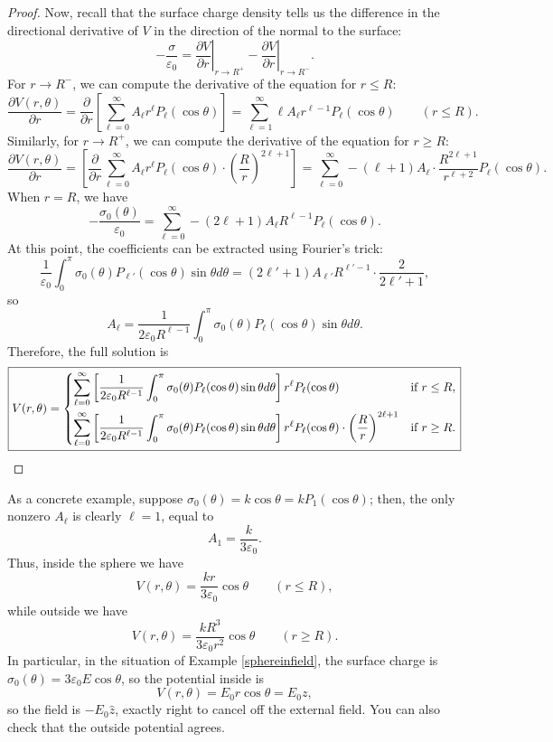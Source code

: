 \begin{proof}
Now, recall that the surface charge density tells us the difference in the directional derivative of $V$ in the direction of the normal to the surface:
\[-\frac{\sigma}{\varepsilon_0}=\left.\frac{\partial V}{\partial r}\right\rvert_{r\to R^+}-\left.\frac{\partial V}{\partial r}\right\rvert_{r\to R^-}.\]
For $r\to R^-$, we can compute the derivative of the equation for $r\le R$:
\[\frac{\partial V(r,\theta)}{\partial r}=\frac{\partial}{\partial r}\left[\sum_{\ell=0}^\infty A_\ell r^\ell P_\ell(\cos\theta)\right]=\sum_{\ell=1}^\infty \ell A_\ell r^{\ell-1}P_\ell(\cos\theta)\qquad (r\le R).\]
Similarly, for $r\to R^+$, we can compute the derivative of the equation for $r\ge R$:
\[\frac{\partial V(r,\theta)}{\partial r}=\left[\frac{\partial}{\partial r}\sum_{\ell=0}^\infty A_{\ell} r^\ell P_\ell(\cos\theta)\cdot\left(\frac{R}{r}\right)^{2\ell+1}\right]=\sum_{\ell=0}^\infty -(\ell+1)A_\ell \cdot \frac{R^{2\ell+1}}{r^{\ell+2}}P_\ell(\cos\theta).\]
When $r=R$, we have
\[-\frac{\sigma_0(\theta)}{\varepsilon_0}=\sum_{\ell=0}^\infty -(2\ell+1)A_\ell R^{\ell-1}P_\ell(\cos\theta).\]
At this point, the coefficients can be extracted using Fourier's trick:
\[\frac{1}{\varepsilon_0}\int_0^\pi \sigma_0(\theta)P_{\ell'}(\cos\theta)\sin\theta d\theta=(2\ell'+1)A_{\ell'}R^{\ell'-1}\cdot \frac{2}{2\ell'+1},\]
so
\[A_{\ell}=\frac{1}{2\varepsilon_0 R^{\ell-1}}\int_0^\pi \sigma_0(\theta)P_\ell(\cos\theta)\sin\theta d\theta.\]
Therefore, the full solution is
\[\boxed{V(r,\theta)=\begin{dcases}
\sum_{\ell=0}^\infty \left[\frac{1}{2\varepsilon_0 R^{\ell-1}}\int_0^\pi \sigma_0(\theta)P_\ell(\cos\theta)\sin\theta d\theta\right]r^\ell P_\ell(\cos\theta) & \text{if }r\le R,\\
\sum_{\ell=0}^\infty \left[\frac{1}{2\varepsilon_0 R^{\ell-1}}\int_0^\pi \sigma_0(\theta)P_\ell(\cos\theta)\sin\theta d\theta\right]r^\ell P_\ell(\cos\theta)\cdot\left(\frac{R}{r}\right)^{2\ell+1} & \text{if }r\ge R.
\end{dcases}}\]
\end{proof}

\begin{remark}
As a concrete example, suppose $\sigma_0(\theta)=k\cos\theta=kP_1(\cos\theta)$; then, the only nonzero $A_\ell$ is clearly $\ell=1$, equal to
\[A_1=\frac{k}{3\varepsilon_0}.\]
Thus, inside the sphere we have
\[V(r,\theta)=\frac{kr}{3\varepsilon_0}\cos\theta \qquad (r\le R),\]
while outside we have
\[V(r,\theta)=\frac{kR^3}{3\varepsilon_0r^2}\cos\theta\qquad (r\ge R).\]
In particular, in the situation of Example \ref{sphereinfield}, the surface charge is $\sigma_0(\theta)=3\varepsilon_0 E\cos\theta$, so the potential inside is
\[V(r,\theta)=E_0r\cos\theta=E_0z,\]
so the field is $-E_0\hat{z}$, exactly right to cancel off the external field. You can also check that the outside potential agrees.
\end{remark}

